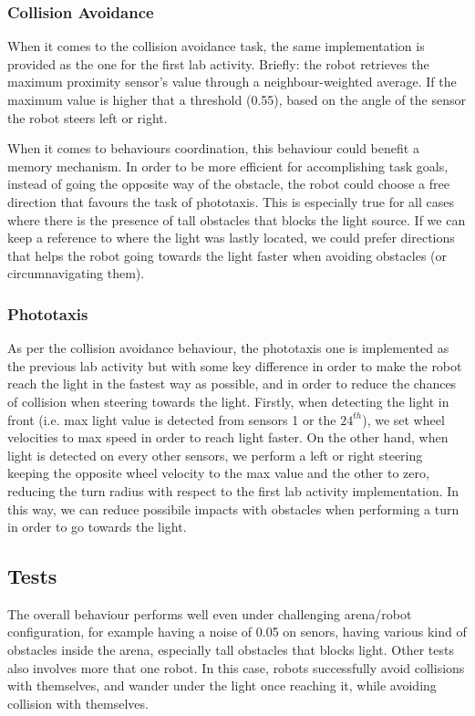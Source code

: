 \subsubsection{Collision Avoidance}
When it comes to the collision avoidance task, the same implementation is
provided as the one for the first lab activity. Briefly: the robot retrieves
the maximum proximity sensor's value through a neighbour-weighted average. If
the maximum value is higher that a threshold (0.55), based on the angle of the
sensor the robot steers left or right.

When it comes to behaviours coordination, this behaviour could benefit a memory
mechanism. In order to be more efficient for accomplishing task goals, instead
of going the opposite way of the obstacle, the robot could choose a free
direction that favours the task of phototaxis. This is especially true for all
cases where there is the presence of tall obstacles that blocks the light
source. If we can keep a reference to where the light was lastly located, we
could prefer directions that helps the robot going towards the light faster
when avoiding obstacles (or circumnavigating them).

\subsubsection{Phototaxis}
As per the collision avoidance behaviour, the phototaxis one is implemented as
the previous lab activity but with some key difference in order to make the
robot reach the light in the fastest way as possible, and in order to reduce
the chances of collision when steering towards the light. Firstly, when
detecting the light in front (i.e. max light value is detected from sensors 1
or the $24^{th}$), we set wheel velocities to max speed in order to reach light
faster. On the other hand, when light is detected on every other sensors, we
perform a left or right steering keeping the opposite wheel velocity to the max
value and the other to zero, reducing the turn radius with respect to the first
lab activity implementation. In this way, we can reduce possibile impacts with
obstacles when performing a turn in order to go towards the light.


\subsection{Tests}
The overall behaviour performs well even under challenging arena/robot
configuration, for example having a noise of 0.05 on senors, having various
kind of obstacles inside the arena, especially tall obstacles that blocks
light. Other tests also involves more that one robot. In this case, robots
successfully avoid collisions with themselves, and wander under the light once
reaching it, while avoiding collision with themselves.

